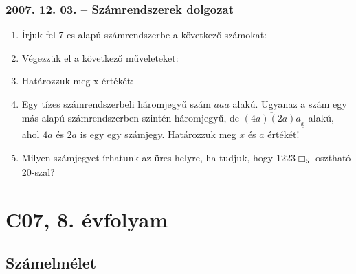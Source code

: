 \subsection*{2007. 12. 03. -- Számrendszerek dolgozat}
\begin{enumerate}
\item Írjuk fel 7-es alapú számrendszerbe a következő számokat:
\item Végezzük el a következő műveleteket:
\item Határozzuk meg x értékét:
\item Egy tízes számrendszerbeli háromjegyű szám $\overline{aaa}$ alakú. Ugyanaz a szám egy más alapú számrendszerben szintén háromjegyű, de $\overline{(4a)(2a)a}_{\underline{x}}$ alakú, ahol $4a$ és $2a$ is egy egy számjegy. Határozzuk meg $x$ és $a$ értékét!
\item Milyen számjegyet írhatunk az üres helyre, ha tudjuk, hogy $1223\Box_{\underline{5}}$ osztható 20-szal?
\end{enumerate}

\chapter{C07, 8. évfolyam}

\section{Számelmélet}


